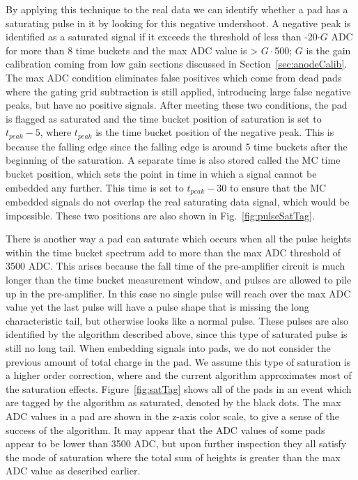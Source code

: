 By applying this technique to the real data we can identify whether a pad has a saturating pulse in it by looking for this negative undershoot. A negative peak is identified as a saturated signal if it exceeds the threshold of less than -20$\cdot G$ ADC for more than 8 time buckets and the max ADC value is > $G\cdot$500; $G$ is the gain calibration coming from low gain sections discussed in Section~\ref{sec:anodeCalib}. The max ADC condition eliminates false positives which come from  dead pads where the gating grid subtraction is still applied, introducing large false negative peaks, but have no positive signals. After meeting these two conditions, the pad is flagged as saturated and the time bucket position of saturation is set to $t_{peak} - 5$, where $t_{peak}$ is the time bucket position of the negative peak. This is because the falling edge since the falling edge is around 5 time buckets after the beginning of the saturation. A separate time is also stored called the MC time bucket position, which sets the point in time in which a signal cannot be embedded any further. This time is set to $t_{peak} - 30$ to ensure that the MC embedded signals do not overlap the real saturating data signal, which would be impossible. These two positions are also shown in Fig.~\ref{fig:pulseSatTag}.

There is another way a pad can saturate which occurs when all the pulse heights within the time bucket spectrum add to more than the max ADC threshold of 3500 ADC. This arises because the fall time of the pre-amplifier circuit is much longer than the time bucket measurement window, and pulses are allowed to pile up in the pre-amplifier. In this case no single pulse will reach over the max ADC value yet the last pulse will have a pulse shape that is missing the long characteristic tail, but otherwise looks like a normal pulse. These pulses are also identified by the algorithm described above, since this type of saturated pulse is still no long tail.  When embedding signals into pads, we do not consider the previous amount of total charge in the pad. We assume this type of saturation is a higher order correction, where and the current algorithm approximates most of the saturation effects.  Figure~\ref{fig:satTag} shows all of the pads in an event which are tagged by the algorithm as saturated, denoted by the black dots. The max ADC values in a pad are shown in the z-axis color scale, to give a sense of the success of the algorithm. It may appear that the ADC values of some pads appear to be lower than 3500 ADC, but upon further inspection they all satisfy the mode of saturation where the total sum of heights is greater than the max ADC value as described earlier. 


